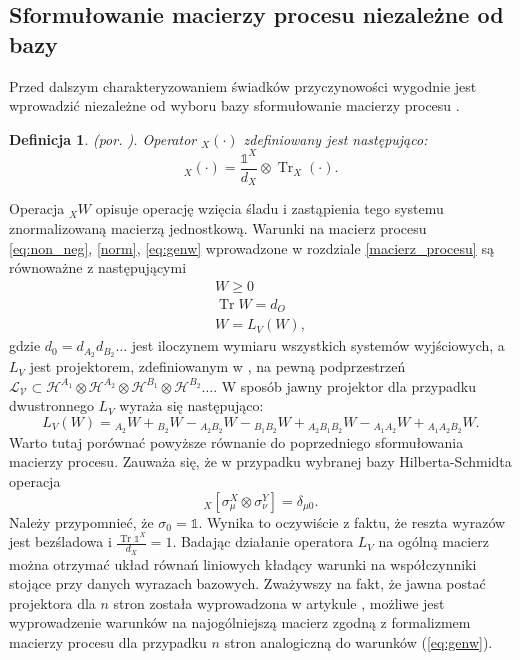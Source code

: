 \documentclass[10pt]{article} %
\newtheorem{definicja}{Definicja}
\DeclareMathOperator{\Trs}{Tr}
\newcommand{\Hx}[1]{\mathcal{H}^{#1}}
\newcommand{\I}{\mathbb{1}}
\begin{document}
\subsection{Sformułowanie macierzy procesu niezależne od bazy}
Przed dalszym charakteryzowaniem świadków przyczynowości wygodnie jest wprowadzić niezależne od wyboru bazy sformułowanie macierzy procesu \cite{causal_witness}.
\begin{definicja}
(por. \cite{causal_witness}).
Operator ${}_X(\cdot)$ zdefiniowany jest następująco:
\begin{equation}
{}_X (\cdot) = \frac{\I^X}{d_X} \otimes \Trs_X (\cdot).
\end{equation}
\end{definicja}
Operacja ${}_XW$ opisuje operację wzięcia śladu i zastąpienia tego systemu znormalizowaną macierzą jednostkową.
Warunki na macierz procesu \eqref{eq:non_neg}, \eqref{norm}, \eqref{eq:genw} wprowadzone w rozdziale \ref{macierz_procesu} są równoważne z następującymi
\begin{gather}
W \geq 0 \\
\Trs W = d_O \\
W = L_V\left(W\right),
\end{gather}
gdzie $d_0 = d_{A_2} d_{B_2} \dots$ jest iloczynem wymiaru wszystkich systemów wyjściowych, a $L_V$ jest projektorem, zdefiniowanym w \cite{causal_witness}, na pewną podprzestrzeń 
$\mathcal{L_V} \subset \Hx{A_1} \otimes \Hx{A_2} \otimes \Hx{B_1} \otimes \Hx{B_2} \dots$.
W sposób jawny projektor dla przypadku dwustronnego $L_V$ wyraża się następująco:
\begin{equation}
\label{eq:projec2}
L_V(W) = {}_{A_2}W + {}_{B_2}W - {}_{A_2B_2}W - {}_{B_1B_2}W + {}_{A_2B_1B_2}W - {}_{A_1A_2}W + {}_{A_1A_2B_2}W.
\end{equation}
Warto tutaj porównać powyższe równanie do poprzedniego sformułowania macierzy procesu. Zauważa się, że w przypadku wybranej bazy Hilberta-Schmidta
operacja
\begin{equation}
{}_X\left[\sigma_\mu^X \otimes \sigma_\nu^Y\right] = \delta_{\mu0}.
\end{equation}
Należy przypomnieć, że $\sigma_0 = \I$.
Wynika to oczywiście z faktu, że reszta wyrazów jest bezśladowa i $\frac{\Trs \I^X}{d_X} = 1$. Badając działanie operatora $L_V$ na ogólną macierz można otrzymać układ równań liniowych kładący warunki na współczynniki stojące przy danych wyrazach bazowych. Zważywszy na fakt, że jawna postać projektora dla $n$ stron została wyprowadzona w artykule \cite{causal_witness}, możliwe jest wyprowadzenie warunków na najogólniejszą macierz zgodną z formalizmem macierzy procesu dla przypadku $n$ stron analogiczną do warunków (\ref{eq:genw}). 
\end{document}
